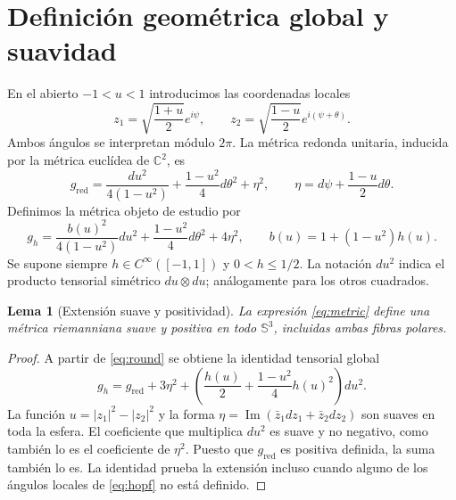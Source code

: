 \documentclass[11pt,a4paper]{article}
\newtheorem{lemma}[theorem]{Lema}
\theoremstyle{remark}\newtheorem{remark}[theorem]{Observación}
\newcommand{\Sthree}{\mathbb S^3}
\newcommand{\C}{\mathbb C}
\begin{document}
\section{Definición geométrica global y suavidad}
En el abierto $-1<u<1$ introducimos las coordenadas locales
\begin{equation}\label{eq:hopf}
z_1=\sqrt{\frac{1+u}{2}}e^{i\psi},\qquad
z_2=\sqrt{\frac{1-u}{2}}e^{i(\psi+\theta)}.
\end{equation}
Ambos ángulos se interpretan módulo $2\pi$. La métrica redonda unitaria, inducida por la métrica euclídea de $\C^2$, es
\begin{equation}\label{eq:round}
g_{\mathrm{red}}=\frac{du^2}{4(1-u^2)}+\frac{1-u^2}{4}d\theta^2+\eta^2,\qquad
\eta=d\psi+\frac{1-u}{2}d\theta.
\end{equation}
Definimos la métrica objeto de estudio por
\begin{equation}\label{eq:metric}
\boxed{g_h=\frac{b(u)^2}{4(1-u^2)}du^2+\frac{1-u^2}{4}d\theta^2+4\eta^2,\qquad b(u)=1+(1-u^2)h(u).}
\end{equation}
Se supone siempre $h\in C^\infty([-1,1])$ y $0<h\leq1/2$. La notación $du^2$ indica el producto tensorial simétrico $du\otimes du$; análogamente para los otros cuadrados.

\begin{lemma}[Extensión suave y positividad]\label{lem:smooth}
La expresión \eqref{eq:metric} define una métrica riemanniana suave y positiva en todo $\Sthree$, incluidas ambas fibras polares.
\end{lemma}
\begin{proof}
A partir de \eqref{eq:round} se obtiene la identidad tensorial global
\[
g_h=g_{\mathrm{red}}+3\eta^2+\left(\frac{h(u)}2+\frac{1-u^2}{4}h(u)^2\right)du^2.
\]
La función $u=|z_1|^2-|z_2|^2$ y la forma $\eta=\operatorname{Im}(\bar z_1dz_1+\bar z_2dz_2)$ son suaves en toda la esfera. El coeficiente que multiplica $du^2$ es suave y no negativo, como también lo es el coeficiente de $\eta^2$. Puesto que $g_{\mathrm{red}}$ es positiva definida, la suma también lo es. La identidad prueba la extensión incluso cuando alguno de los ángulos locales de \eqref{eq:hopf} no está definido.
\end{proof}
\end{document}

